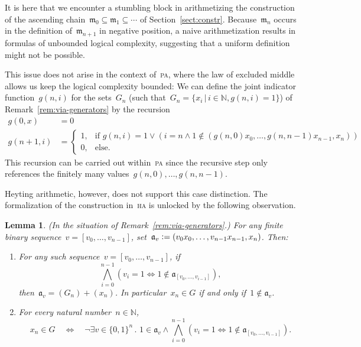 \documentclass[oneside,reqno]{amsart}
\theoremstyle{definition}
\theoremstyle{plain}
\newtheorem{lemma}[defn]{Lemma}
\theoremstyle{remark}
\newcommand{\aaa}{\mathfrak{a}}
\newcommand{\mmm}{\mathfrak{m}}
\newcommand{\NN}{\mathbb{N}}
\newcommand{\defeq}{\vcentcolon=}
\renewcommand{\_}{\mathpunct{.}\,}
\begin{document}
It is here that we encounter a stumbling block in arithmetizing the
construction of the ascending chain~$\mmm_0 \subseteq \mmm_1 \subseteq \cdots$
of Section~\ref{sect:constr}. Because~$\mmm_n$ occurs in the
definition of~$\mmm_{n+1}$ in negative position, a naive arithmetization
results in formulas of unbounded logical complexity, suggesting that
a uniform definition might not be possible.

This issue does not arise in the context of~\textsc{pa}, where the law of
excluded middle allows us keep the logical complexity bounded: We can define
the joint indicator function~$g(n,i)$ for the sets~$G_n$ (such that~$G_n = \{
x_i \,|\, i \in \NN, g(n,i) = 1 \}$) of Remark~\ref{rem:via-generators} by the recursion
\begin{align*}
  g(0,x) &= 0 \\
  g(n+1,i) &= \begin{cases}
    1, & \text{if $g(n,i) = 1 \vee (i = n \wedge 1 \not\in
    (g(n,0)x_0,\ldots,g(n,n-1)x_{n-1},x_n))$} \\
    0, & \text{else.}
  \end{cases}
\end{align*}
This recursion can be carried out within~\textsc{pa} since the recursive step
only references the finitely many values~$g(n,0),\ldots,g(n,n-1)$.

Heyting arithmetic, however, does not support this case distinction. The
formalization of the construction in~\textsc{ha} is unlocked by the following
observation.

\begin{lemma}\label{lemma:uniform-char}(In the situation of Remark~\ref{rem:via-generators}.)
For any finite binary sequence~$v = [v_0,\ldots,v_{n-1}]$, set~$\aaa_v
\defeq (v_0x_0,\ldots,v_{n-1}x_{n-1},x_n)$. Then:
\begin{enumerate}
\item For any such sequence~$v = [v_0,\ldots,v_{n-1}]$, if
\[ \bigwedge_{i=0}^{n-1} (v_i = 1 \Leftrightarrow 1 \not\in \aaa_{[v_0,\ldots,v_{i-1}]}), \]
then~$\aaa_v = (G_n) + (x_n)$.
In particular~$x_n \in G$ if and only if~$1 \not\in \aaa_v$.
\item For every natural number~$n \in \NN$,
\[ x_n \in G \quad\Longleftrightarrow\quad \neg
  \exists v \in \{0,1\}^n\_
    1 \in \aaa_v \wedge
      \bigwedge_{i=0}^{n-1} (v_i = 1 \Leftrightarrow 1 \not\in \aaa_{[v_0,\ldots,v_{i-1}]}). \]
\end{enumerate}
\end{lemma}
\end{document}
